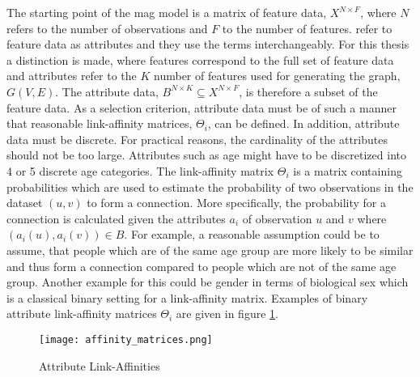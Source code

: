 	\noindent The starting point of the \acs{mag} model is a matrix of feature 
	data, $X^{N \times F}$, where $N$ refers to the number of observations 
	and $F$ to the number of features. \citeauthor{kim2012multiplicative} refer 
	to feature data as attributes and they use the terms interchangeably. For this 
	thesis a distinction is made, where features correspond to the full set of 
	feature data and attributes refer to the $K$ number of features used for 
	generating the graph, $G(V,E)$. The attribute data, 
	$B^{N \times K} \subseteq X^{N \times F}$, is therefore a subset of the 
	feature data. As a selection criterion, attribute data must be of such a 
	manner that reasonable link-affinity matrices, $\Theta_{i}$, can be 
	defined. In addition, attribute data must be discrete. For practical
	reasons, the cardinality of the attributes should not be too large.
	Attributes such as age might have to be discretized into 4 or 5 discrete
	age categories. The link-affinity matrix $\Theta_{i}$ is a matrix
	containing probabilities which are used to estimate the probability of two 
	observations in the dataset $(u,v)$ to form a connection. More specifically, 
	the probability for a connection is calculated given the attributes $a_i$ of 
	observation $u$ and $v$ where $(a_{i}(u),a_{i}(v))\in B$. For example, a 
	reasonable assumption could be to assume, that people which are of the same 
	age group are more likely to be similar and thus form a connection 
	compared to people which are not of the same age group. Another example for 
	this could be gender in terms of biological sex which is a classical binary 
	setting for a link-affinity matrix. Examples of binary attribute 
	link-affinity matrices $\Theta_i$ are given in 
	figure \ref{fig:link-affinity}.

	\begin{figure}[h]
		\centering
		\texttt{[image: affinity\_matrices.png]}
		\caption{Attribute Link-Affinities}
		\cite[p. 118]{kim2012multiplicative}
		\label{fig:link-affinity}
	\end{figure}

